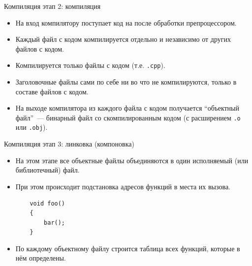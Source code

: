 \documentclass[aspectration=1610,t]{beamer}
\begin{document}
\begin{frame}[fragile]{Компиляция этап  2: компиляция}
    \begin{itemize}
        \item На вход компилятору поступает код на \langcpp после обработки
            препроцессором.
        \item Каждый файл с кодом компилируется отдельно и независимо от других
            файлов с кодом.
        \item Компилируется только файлы с кодом (т.е. {\tt *.cpp}).
        \item Заголовочные файлы сами по себе ни во что не компилируются, только в
            составе файлов с кодом.
        \item На выходе компилятора из каждого файла с кодом получается ``объектный
            файл''~--- бинарный файл со скомпилированным кодом (с расширением
            \texttt{.o} или \texttt{.obj}).
    \end{itemize}
\end{frame}

\begin{frame}[fragile]{Компиляция этап 3: линковка (компоновка)}
    \begin{itemize}
        \item На этом этапе все объектные файлы объединяются в один исполняемый 
            (или библиотечный) файл.
        \item При этом происходит подстановка адресов функций в места их вызова.
        \begin{lstlisting}
    void foo()
    {
        bar();
    }
    \end{lstlisting}
        \item По каждому объектному файлу строится таблица всех
            функций, которые в нём определены.
    \end{itemize}
\end{frame}
\end{document}
